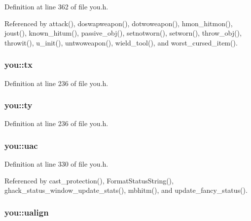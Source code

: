Definition at line 362 of file you.\+h.



Referenced by attack(), doswapweapon(), dotwoweapon(), hmon\+\_\+hitmon(), joust(), known\+\_\+hitum(), passive\+\_\+obj(), setnotworn(), setworn(), throw\+\_\+obj(), throwit(), u\+\_\+init(), untwoweapon(), wield\+\_\+tool(), and worst\+\_\+cursed\+\_\+item().

\hypertarget{structyou_abacfd16663707ad0fb11ffa050794019}{
\subsubsection[{tx}]{ you\+::tx}}\label{structyou_abacfd16663707ad0fb11ffa050794019}


Definition at line 236 of file you.\+h.

\hypertarget{structyou_a91f49608ba8ded7d5d93bd11d4e570ba}{
\subsubsection[{ty}]{ you\+::ty}}\label{structyou_a91f49608ba8ded7d5d93bd11d4e570ba}


Definition at line 236 of file you.\+h.

\hypertarget{structyou_a4286c7d027f70b103209bb3406ea3d85}{
\subsubsection[{uac}]{ you\+::uac}}\label{structyou_a4286c7d027f70b103209bb3406ea3d85}


Definition at line 330 of file you.\+h.



Referenced by cast\+\_\+protection(), Format\+Status\+String(), ghack\+\_\+status\+\_\+window\+\_\+update\+\_\+stats(), mbhitm(), and update\+\_\+fancy\+\_\+status().

\hypertarget{structyou_a3f202dd89a837a9772a9eb1f1965f30c}{
\subsubsection[{ualign}]{ you\+::ualign}}\label{structyou_a3f202dd89a837a9772a9eb1f1965f30c}


